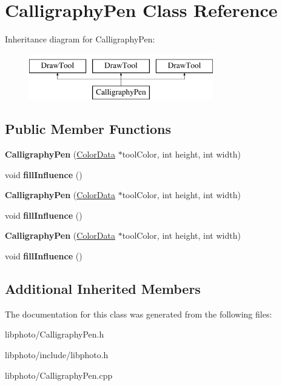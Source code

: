 \hypertarget{classCalligraphyPen}{\section{Calligraphy\-Pen Class Reference}
\label{classCalligraphyPen}
}
Inheritance diagram for Calligraphy\-Pen\-:\begin{figure}[H]
\begin{center}
\leavevmode
\includegraphics[height=2.000000cm]{classCalligraphyPen}
\end{center}
\end{figure}
\subsection*{Public Member Functions}
\begin{DoxyCompactItemize}
\item 
\hypertarget{classCalligraphyPen_a0a7aee1d27a037b4d863df7433530e54}{{\bfseries Calligraphy\-Pen} (\hyperlink{classColorData}{Color\-Data} $\ast$tool\-Color, int height, int width)}\label{classCalligraphyPen_a0a7aee1d27a037b4d863df7433530e54}

\item 
\hypertarget{classCalligraphyPen_add13526712abc99aad6cac69274d35ef}{void {\bfseries fill\-Influence} ()}\label{classCalligraphyPen_add13526712abc99aad6cac69274d35ef}

\item 
\hypertarget{classCalligraphyPen_a0a7aee1d27a037b4d863df7433530e54}{{\bfseries Calligraphy\-Pen} (\hyperlink{classColorData}{Color\-Data} $\ast$tool\-Color, int height, int width)}\label{classCalligraphyPen_a0a7aee1d27a037b4d863df7433530e54}

\item 
\hypertarget{classCalligraphyPen_add13526712abc99aad6cac69274d35ef}{void {\bfseries fill\-Influence} ()}\label{classCalligraphyPen_add13526712abc99aad6cac69274d35ef}

\item 
\hypertarget{classCalligraphyPen_a0a7aee1d27a037b4d863df7433530e54}{{\bfseries Calligraphy\-Pen} (\hyperlink{classColorData}{Color\-Data} $\ast$tool\-Color, int height, int width)}\label{classCalligraphyPen_a0a7aee1d27a037b4d863df7433530e54}

\item 
\hypertarget{classCalligraphyPen_add13526712abc99aad6cac69274d35ef}{void {\bfseries fill\-Influence} ()}\label{classCalligraphyPen_add13526712abc99aad6cac69274d35ef}

\end{DoxyCompactItemize}
\subsection*{Additional Inherited Members}


The documentation for this class was generated from the following files\-:\begin{DoxyCompactItemize}
\item 
libphoto/Calligraphy\-Pen.\-h\item 
libphoto/include/libphoto.\-h\item 
libphoto/Calligraphy\-Pen.\-cpp\end{DoxyCompactItemize}
